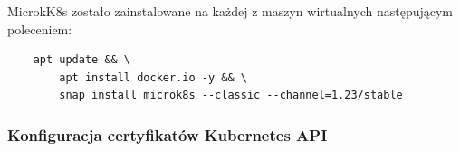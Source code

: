 MicrokK8s zostało zainstalowane na każdej z maszyn wirtualnych następującym poleceniem:
\begin{verbatim}
    apt update && \
        apt install docker.io -y && \
        snap install microk8s --classic --channel=1.23/stable
\end{verbatim}

\subsubsection{Konfiguracja certyfikatów Kubernetes API}

